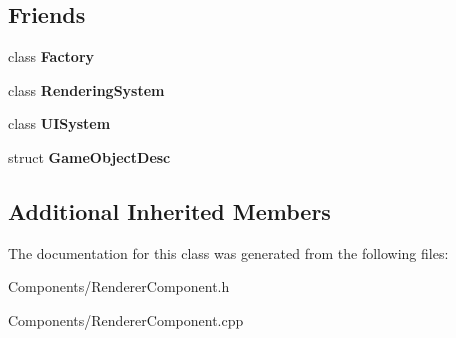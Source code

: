 \subsection*{Friends}
\begin{DoxyCompactItemize}
\item 
\mbox{\label{classRendererComponent_a328c093d609680cca505905c6d49901a}} 
class {\bfseries Factory}
\item 
\mbox{\label{classRendererComponent_a8973bdd326799bb9e3e2d3bf6c98778d}} 
class {\bfseries Rendering\+System}
\item 
\mbox{\label{classRendererComponent_a3c5cff3eae5326599fd1851d48d2a07b}} 
class {\bfseries U\+I\+System}
\item 
\mbox{\label{classRendererComponent_a23d2fc1faa79753953263847a5a4f553}} 
struct {\bfseries Game\+Object\+Desc}
\end{DoxyCompactItemize}
\subsection*{Additional Inherited Members}


The documentation for this class was generated from the following files\+:\begin{DoxyCompactItemize}
\item 
Components/Renderer\+Component.\+h\item 
Components/Renderer\+Component.\+cpp\end{DoxyCompactItemize}
